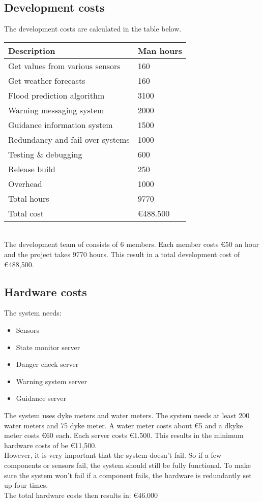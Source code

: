 \subsection{Development costs}
The development costs are calculated in the table below.\\
\newline
\begin{tabular}{|L{}|L{}|}
	\toprule
	\textbf{Description} & \textbf{Man hours} \\ \midrule
	Get values from various sensors & 160 \\ \midrule
	Get weather forecasts & 160 \\ \midrule
	Flood prediction algorithm & 3100 \\ \midrule
	Warning messaging system  & 2000 \\ \midrule
	Guidance information system & 1500 \\ \midrule
	Redundancy and fail over systems & 1000 \\ \midrule
	Testing \& debugging & 600 \\ \midrule
	Release build & 250 \\ \midrule
	Overhead & 1000 \\ \midrule
	Total hours & 9770 \\ \midrule
	Total cost & \euro{}488.500 \\ \bottomrule
\end{tabular}\\
\newline
The development team of \CompanyName consists of 6 members. Each member costs  \euro{}{}50 an hour and the project takes 9770 hours. This result in a total development cost of \euro{}{}488,500.

\subsection{Hardware costs}
The system needs:
\begin{itemize}
	\item Sensors
	\item {State monitor server}
	\item {Danger check server}	
	\item {Warning system server}	
	\item {Guidance server}	
\end{itemize}
The system uses dyke meters and water meters. The system needs at least 200 water meters and 75 dyke meter. A water meter costs about \euro{}5 and a dkyke meter costs \euro{}60 each. Each server costs \euro{}1.500. This results in the minimum hardware costs of be \euro{}11,500. \\
 However, it is very important that the system doesn't fail. So if a few components or sensors fail, the system should still be fully functional. To make sure the system won't fail if a component fails, the hardware is redundantly set up four times.\\
 The total hardware costs then results in: \euro{}46.000

